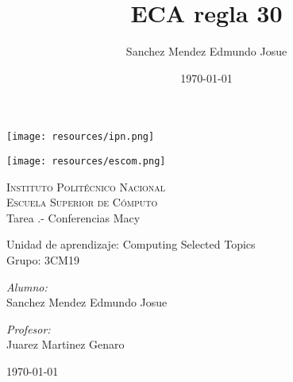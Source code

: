 \documentclass[11pt]{article}
\date{\today}
\title{ECA regla 30}
\author{Sanchez Mendez Edmundo Josue}
\begin{document}
		\begin{titlepage}
			\begin{center}
				
				
				\noindent
				\begin{minipage}{0.5\textwidth}
					\begin{flushleft} \large
						\texttt{[image: resources/ipn.png]}
					\end{flushleft}
				\end{minipage}%
				\begin{minipage}{0.55\textwidth}
					\begin{flushright} \large
						\texttt{[image: resources/escom.png]}
					\end{flushright}
				\end{minipage}
				
				\textsc{\LARGE Instituto Politécnico Nacional}\\[0.5cm]
				
				\textsc{\Large Escuela Superior de Cómputo}\\[1cm]
				
				
				{ \huge Tarea .- Conferencias Macy  \\[1cm] }
				
				{ \Large Unidad de aprendizaje: Computing Selected Topics} \\[1cm]
				
				{ \Large Grupo: 3CM19 } \\[1cm]
				
				\noindent
				\begin{minipage}{0.5\textwidth}
					\begin{flushleft} \large
						\emph{Alumno:} \\
						Sanchez Mendez Edmundo Josue
					\end{flushleft}
				\end{minipage}%
				\begin{minipage}{0.5\textwidth}
					\begin{flushright} \large
						\emph{Profesor:} \\
						Juarez Martinez Genaro
					\end{flushright}
				\end{minipage}
				
				\vfill
				{\large {\today}}
			\end{center}
		\end{titlepage}
	
\end{document}
